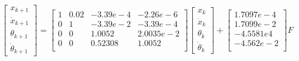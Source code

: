\documentclass{article}
\begin{document}
\begin{equation}
\begin{bmatrix}
x_{k+1} \\
\dot{x}_{k+1} \\
\theta_{k+1} \\
\dot{\theta}_{k+1}
\end{bmatrix}
=
\begin{bmatrix}
1 & 0.02 & -3.39e-4 & -2.26e-6\\
0 & 1 & -3.39e-2 & -3.39e-4\\
0 & 0 & 1.0052 & 2.0035e-2\\
0 & 0 & 0.52308 & 1.0052\\
\end{bmatrix}
\begin{bmatrix}
x_{k} \\
\dot{x}_{k} \\
\theta_{k} \\
\dot{\theta}_{k}
\end{bmatrix}
+
\begin{bmatrix}
1.7097e-4\\
1.7099e-2\\
-4.5581e4\\
-4.562e-2\\
\end{bmatrix}
F
\label{eq:linear_discrete}
\end{equation}
\end{document}
